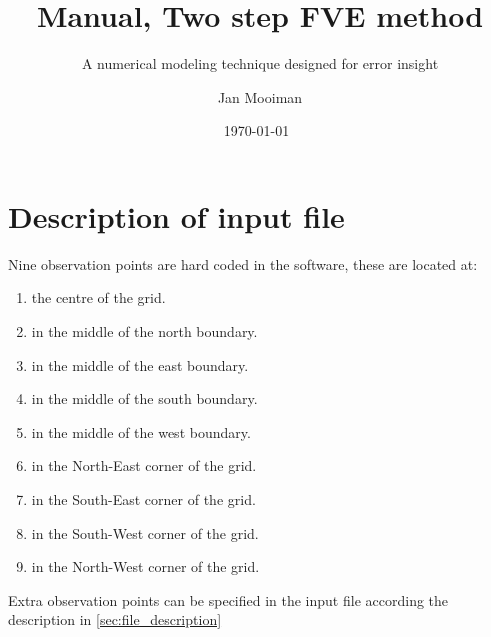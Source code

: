 \documentclass[subfooter, backcover]{mooiman_memo}
\begin{document}
\title{Manual, Two step FVE method}
\subtitle{A numerical modeling technique designed for error insight}
\author{Jan Mooiman}
\partner{}

\date{\today~\currenttime} %

\memoTo{}

\mooimantitle
\chapter{Description of input file}
Nine observation points are hard coded in the software, these are located at:
\begin{enumerate}
    \item the centre of the grid.
    \item in the middle of the north boundary.
    \item in the middle of the east boundary.
    \item in the middle of the south boundary.
    \item in the middle of the west boundary.
    \item in the North-East corner of the grid.
    \item in the South-East corner of the grid.
    \item in the South-West corner of the grid.
    \item in the North-West corner of the grid.
\end{enumerate}
Extra observation points can be specified in the input file according the description in \autoref{sec:file_description}
\end{document}

